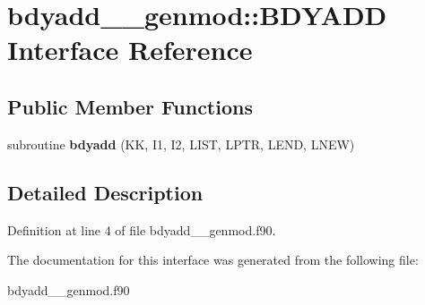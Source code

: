 \hypertarget{interfacebdyadd____genmod_1_1_b_d_y_a_d_d}{\section{bdyadd\+\_\+\+\_\+genmod\+:\+:B\+D\+Y\+A\+D\+D Interface Reference}
\label{interfacebdyadd____genmod_1_1_b_d_y_a_d_d}
}
\subsection*{Public Member Functions}
\begin{DoxyCompactItemize}
\item 
\hypertarget{interfacebdyadd____genmod_1_1_b_d_y_a_d_d_ae880e92d23c8c619df83b46e2aa2b1e0}{subroutine {\bfseries bdyadd} (K\+K, I1, I2, L\+I\+S\+T, L\+P\+T\+R, L\+E\+N\+D, L\+N\+E\+W)}\label{interfacebdyadd____genmod_1_1_b_d_y_a_d_d_ae880e92d23c8c619df83b46e2aa2b1e0}

\end{DoxyCompactItemize}


\subsection{Detailed Description}


Definition at line 4 of file bdyadd\+\_\+\+\_\+genmod.\+f90.



The documentation for this interface was generated from the following file\+:\begin{DoxyCompactItemize}
\item 
bdyadd\+\_\+\+\_\+genmod.\+f90\end{DoxyCompactItemize}
